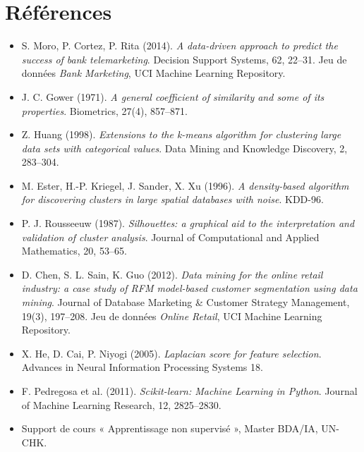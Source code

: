 \documentclass[11pt,a4paper]{article}
\begin{document}
\section*{Références}
\begin{itemize}
\item S. Moro, P. Cortez, P. Rita (2014). \emph{A data-driven approach to predict the success of bank telemarketing}. Decision Support Systems, 62, 22--31. Jeu de données \emph{Bank Marketing}, UCI Machine Learning Repository.
\item J. C. Gower (1971). \emph{A general coefficient of similarity and some of its properties}. Biometrics, 27(4), 857--871.
\item Z. Huang (1998). \emph{Extensions to the k-means algorithm for clustering large data sets with categorical values}. Data Mining and Knowledge Discovery, 2, 283--304.
\item M. Ester, H.-P. Kriegel, J. Sander, X. Xu (1996). \emph{A density-based algorithm for discovering clusters in large spatial databases with noise}. KDD-96.
\item P. J. Rousseeuw (1987). \emph{Silhouettes: a graphical aid to the interpretation and validation of cluster analysis}. Journal of Computational and Applied Mathematics, 20, 53--65.
\item D. Chen, S. L. Sain, K. Guo (2012). \emph{Data mining for the online retail industry: a case study of RFM model-based customer segmentation using data mining}. Journal of Database Marketing \& Customer Strategy Management, 19(3), 197--208. Jeu de données \emph{Online Retail}, UCI Machine Learning Repository.
\item X. He, D. Cai, P. Niyogi (2005). \emph{Laplacian score for feature selection}. Advances in Neural Information Processing Systems 18.
\item F. Pedregosa et al. (2011). \emph{Scikit-learn: Machine Learning in Python}. Journal of Machine Learning Research, 12, 2825--2830.
\item Support de cours « Apprentissage non supervisé », Master BDA/IA, UN-CHK.
\end{itemize}
\end{document}
